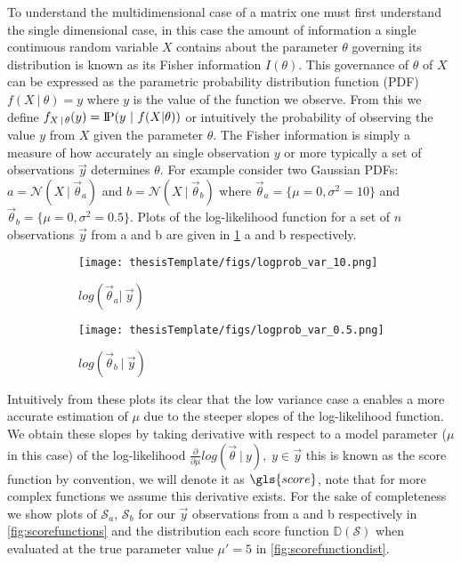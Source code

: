 To understand the multidimensional case of a matrix one must first understand the single dimensional case, in this case the amount of information a single continuous random variable $X$ contains about the parameter $\theta$ governing its distribution is known as its Fisher information $I(\theta)$. This governance of $\theta$ of $X$ can be expressed as the parametric probability distribution function (PDF) $f(X\ |\ \theta) = y$ where $y$ is the value of the function we observe. From this we define $f_{X\,|\,\theta}(y) = \probP(y\ |\ f(X|\theta))$ or intuitively the probability of observing the value $y$ from $X$ given the parameter $\theta$. The Fisher information is simply a measure of how accurately an single observation $y$ or more typically a set of observations $\vec{y}$ determines $\theta$. For example consider two Gaussian PDFs: $a = \mathcal{N}(X\ |\ \vec{\theta}_a)$ and $b = \mathcal{N}(X\ |\ \vec{\theta}_b)$ where $\vec{\theta}_a = \{\mu=0, \sigma^2=10\}$ and $\vec{\theta}_b = \{\mu=0,\sigma^2=0.5\}$. Plots of the log-likelihood function for a set of $n$ observations $\vec{y}$ from a and b are given in \cref{fig:loglikelihoods} a and b respectively.
\begin{figure}[H]
    \centering
    \begin{subfigure}{0.475\textwidth}
        \texttt{[image: thesisTemplate/figs/logprob\_var\_10.png]}
        \caption[]{$log(\vec{\theta}_a |\ \vec{y})$}
    \end{subfigure}
    \begin{subfigure}{0.475\textwidth}
        \texttt{[image: thesisTemplate/figs/logprob\_var\_0.5.png]}
        \caption[]{$log(\vec{\theta}_b\ |\ \vec{y})$}
    \end{subfigure}
    \caption[Log-likelihood's of observations given a Gaussian distribution]{}
    \label{fig:loglikelihoods}
\end{figure}
\noindent Intuitively from these plots its clear that the low variance case a enables a more accurate estimation of $\mu$ due to the steeper slopes of the log-likelihood function. We obtain these slopes by taking derivative with respect to a model parameter ($\mu$ in this case) of the log-likelihood $\frac{\partial}{\partial\mu} log(\vec{\theta}\ |\ y),\;y\in\vec{y}$ this is known as the score function by convention, we will denote it as $\gls{score}$, note that for more complex functions we assume this derivative exists. For the sake of completeness we show plots of $\mathcal{S}_a$, $\mathcal{S}_b$ for our $\vec{y}$ observations from a and b respectively in \cref{fig:scorefunctions} and the distribution each score function $\mathbb{D}(\mathcal{S})$ when evaluated at the true parameter value $\mu' = 5$ in \cref{fig:scorefunctiondist}.
